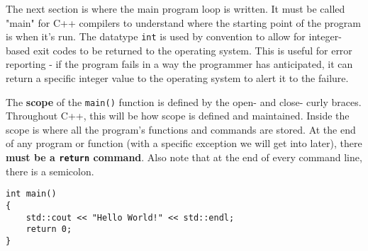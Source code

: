 The next section is where the main program loop is written.  It must be called "main" for C++ compilers to understand where the starting point of the program is when it's run.  The datatype \texttt{int} is used by convention to allow for integer-based exit codes to be returned to the operating system.  This is useful for error reporting - if the program fails in a way the programmer has anticipated, it can return a specific integer value to the operating system to alert it to the failure.

The \textbf{scope} of the \texttt{main()} function is defined by the open- and close- curly braces.  Throughout C++, this will be how scope is defined and maintained.  Inside the scope is where all the program's functions and commands are stored.  At the end of any program or function (with a specific exception we will get into later), there \textbf{must be a \texttt{return} command}.  Also note that at the end of every command line, there is a semicolon.
\begin{verbatim}
int main()
{
    std::cout << "Hello World!" << std::endl;
    return 0;
}
\end{verbatim}
